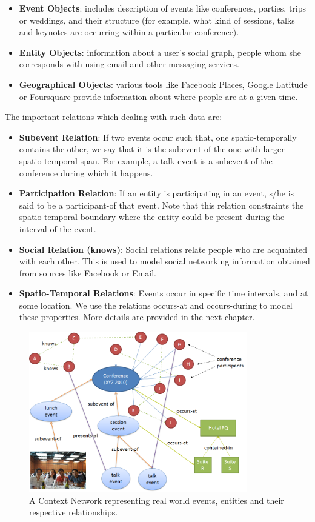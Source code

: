 \begin{itemize}
\item \textbf{Event Objects}: includes description of events like conferences, parties, trips or weddings, and their structure (for example, what kind of sessions, talks and keynotes are occurring within a particular conference).
\item \textbf{Entity Objects}: information about a user's social graph, people whom she corresponds with using email and other messaging services.
\item \textbf{Geographical Objects}: various tools like Facebook Places, Google Latitude or Foursquare provide information about where people are at a given time.
\end{itemize}

The important relations which dealing with such data are:

\begin{itemize}
\item \textbf{Subevent Relation}: If two events occur such that, one spatio-temporally contains the other, we say that it is the subevent of the one with larger spatio-temporal span. For example, a talk event is a subevent of the conference during which it happens.
\item \textbf{Participation Relation}: If an entity is participating in an event, s/he is said to be a participant-of that event. Note that this relation constraints the spatio-temporal boundary where the entity could be present during the interval of the event.
\item \textbf{Social Relation (knows)}: Social relations relate people who are acquainted with each other. This is used to model social networking information obtained from sources like Facebook or Email.
\item \textbf{Spatio-Temporal Relations}: Events occur in specific time intervals, and at some location. We use the relations occurs-at and occurs-during to model these properties. More details are provided in the next chapter.
\end{itemize}

\begin{figure}[h]
\centering
\includegraphics[width=0.85\textwidth]{media/chapter2/context-network-large.png}
\caption{A Context Network representing real world events, entities and their respective relationships.}
\label{fig:context-network-large}
\end{figure}

